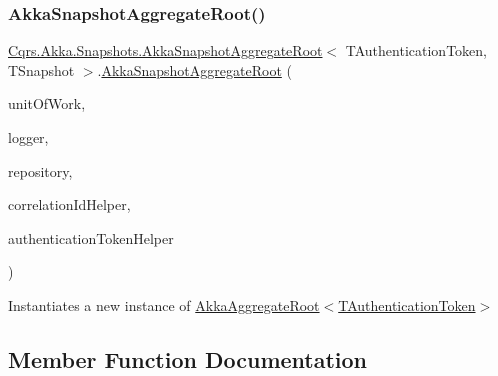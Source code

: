 \subsubsection{\texorpdfstring{Akka\+Snapshot\+Aggregate\+Root()}{AkkaSnapshotAggregateRoot()}}
{\footnotesize\ttfamily \hyperlink{classCqrs_1_1Akka_1_1Snapshots_1_1AkkaSnapshotAggregateRoot}{Cqrs.\+Akka.\+Snapshots.\+Akka\+Snapshot\+Aggregate\+Root}$<$ T\+Authentication\+Token, T\+Snapshot $>$.\hyperlink{classCqrs_1_1Akka_1_1Snapshots_1_1AkkaSnapshotAggregateRoot}{Akka\+Snapshot\+Aggregate\+Root} (\begin{DoxyParamCaption}\item[{\hyperlink{interfaceCqrs_1_1Domain_1_1IUnitOfWork}{I\+Unit\+Of\+Work}$<$ T\+Authentication\+Token $>$}]{unit\+Of\+Work,  }\item[{I\+Logger}]{logger,  }\item[{\hyperlink{interfaceCqrs_1_1Akka_1_1Domain_1_1IAkkaAggregateRepository}{I\+Akka\+Aggregate\+Repository}$<$ T\+Authentication\+Token $>$}]{repository,  }\item[{I\+Correlation\+Id\+Helper}]{correlation\+Id\+Helper,  }\item[{\hyperlink{interfaceCqrs_1_1Authentication_1_1IAuthenticationTokenHelper}{I\+Authentication\+Token\+Helper}$<$ T\+Authentication\+Token $>$}]{authentication\+Token\+Helper }\end{DoxyParamCaption})\hspace{0.3cm}{\ttfamily [protected]}}



Instantiates a new instance of \hyperlink{classCqrs_1_1Akka_1_1Domain_1_1AkkaAggregateRoot_a060f981e4c3023aec36e7c6f1cfb3a9d_a060f981e4c3023aec36e7c6f1cfb3a9d}{Akka\+Aggregate\+Root$<$\+T\+Authentication\+Token$>$} 



\subsection{Member Function Documentation}
\mbox{\label{classCqrs_1_1Akka_1_1Snapshots_1_1AkkaSnapshotAggregateRoot_af8493f71231046d91210406c3b831e20_af8493f71231046d91210406c3b831e20}} 
